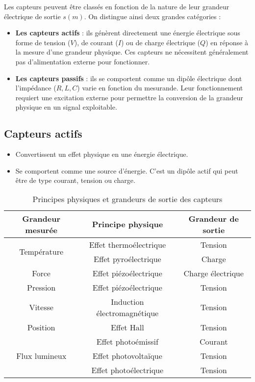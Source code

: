Les capteurs peuvent être classés en fonction de la nature de leur grandeur 
électrique de sortie \( s(m) \). On distingue ainsi deux grandes catégories :  

\begin{itemize}
    \item \textbf{Les capteurs actifs} : ils génèrent directement une énergie 
    électrique sous forme de tension (\( V \)), de courant (\( I \)) ou de 
    charge électrique (\( Q \)) en réponse à la mesure d'une grandeur physique. 
    Ces capteurs ne nécessitent généralement pas d'alimentation externe pour 
    fonctionner.  
    \item \textbf{Les capteurs passifs} : ils se comportent comme un dipôle 
    électrique dont l'impédance (\( R, L, C \)) varie en fonction du mesurande. 
    Leur fonctionnement requiert une excitation externe pour permettre la 
    conversion de la grandeur physique en un signal exploitable.  
\end{itemize}

\subsection{Capteurs actifs}
\begin{itemize}
    \item Convertissent un effet physique en une énergie électrique.
    \item Se comportent comme une source d'énergie. C'est un dipôle actif qui 
    peut être de type courant, tension ou charge.
\end{itemize}

\begin{table}[h]
    \centering
    \renewcommand{\arraystretch}{1.3} %
    \begin{tabular}{|c|c|c|}
        \hline
        \textbf{Grandeur mesurée} & \textbf{Principe physique} & \textbf{Grandeur de sortie} \\
        \hline
        \multirow{2}{*}{Température} & Effet thermoélectrique & Tension \\
        & Effet pyroélectrique & Charge \\
        \hline
        Force & Effet piézoélectrique & Charge électrique \\
        \hline
        Pression & Effet piézoélectrique & Tension \\
        \hline
        Vitesse & Induction électromagnétique & Tension \\
        \hline
        Position & Effet Hall & Tension \\
        \hline
        \multirow{3}{*}{Flux lumineux} & Effet photoémissif & Courant \\
        & Effet photovoltaïque & Tension \\
        & Effet photoélectrique & Tension \\
        \hline
    \end{tabular}
    \caption{Principes physiques et grandeurs de sortie des capteurs}
    \label{tab:capteurs}
\end{table}


